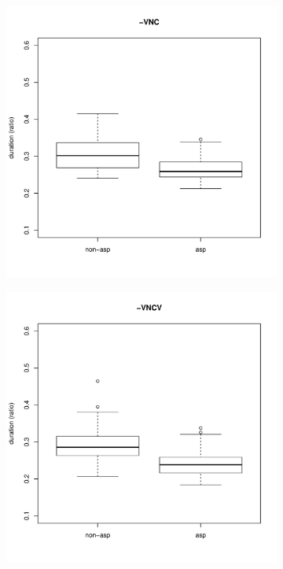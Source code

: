 \documentclass[11pt,a4paper,openany]{memoir}\usepackage[]{graphicx}\usepackage[]{color}
\newenvironment{knitrout}{}{} %
\begin{document}
\begin{figure}
\begin{subfigure}{.5\textwidth}
\begin{knitrout}
\end{knitrout}
\end{subfigure}
\begin{subfigure}{.5\textwidth}
\centering
\begin{knitrout}
\color{fgcolor}
\includegraphics[width=\textwidth]{img/mono-nas-box-1} 

\end{knitrout}
\end{subfigure}
\begin{subfigure}{.5\textwidth}
\centering
\begin{knitrout}
\color{fgcolor}
\includegraphics[width=\textwidth]{img/di-nas-box-1} 


\end{knitrout}
\end{subfigure}
\end{figure}
\end{document}
